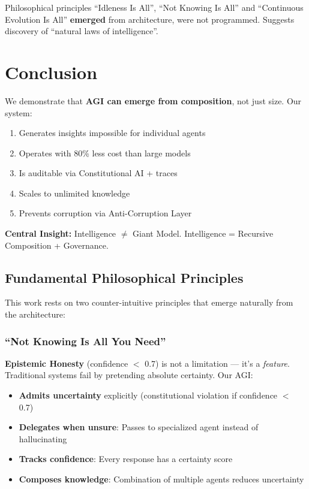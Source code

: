 \documentclass[11pt]{article}
\begin{document}
Philosophical principles ``Idleness Is All'', ``Not Knowing Is All'' and ``Continuous Evolution Is All'' \textbf{emerged} from architecture, were not programmed. Suggests discovery of ``natural laws of intelligence''.

\section{Conclusion}

We demonstrate that \textbf{AGI can emerge from composition}, not just size. Our system:

\begin{enumerate}
    \item Generates insights impossible for individual agents
    \item Operates with 80\% less cost than large models
    \item Is auditable via Constitutional AI + traces
    \item Scales to unlimited knowledge
    \item Prevents corruption via Anti-Corruption Layer
\end{enumerate}

\textbf{Central Insight:} Intelligence $\neq$ Giant Model. Intelligence = Recursive Composition + Governance.

\subsection{Fundamental Philosophical Principles}

This work rests on two counter-intuitive principles that emerge naturally from the architecture:

\subsubsection{``Not Knowing Is All You Need''}

\textbf{Epistemic Honesty} (confidence $<$ 0.7) is not a limitation --- it's a \textit{feature}. Traditional systems fail by pretending absolute certainty. Our AGI:

\begin{itemize}
    \item \textbf{Admits uncertainty} explicitly (constitutional violation if confidence $<$ 0.7)
    \item \textbf{Delegates when unsure}: Passes to specialized agent instead of hallucinating
    \item \textbf{Tracks confidence}: Every response has a certainty score
    \item \textbf{Composes knowledge}: Combination of multiple agents reduces uncertainty
\end{itemize}
\end{document}
